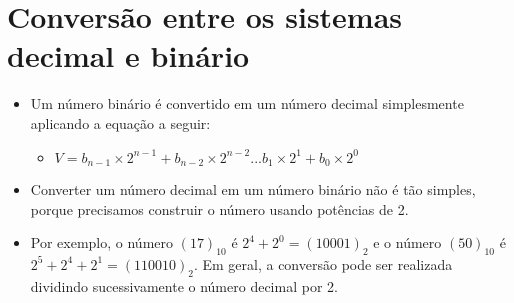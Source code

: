 \section{Conversão entre os sistemas decimal e binário}

\begin{frame}{\insertsection}
	\begin{itemize}
        \item Um número binário é convertido em um número decimal simplesmente aplicando a equação a seguir:
        \begin{itemize}
            \item $V = b_{n-1} \times 2^{n-1} + b_{n-2} \times 2^{n-2} ... b_1 \times 2^1 + b_0 \times 2^0$
        \end{itemize}
        \item Converter um número decimal em um número binário não é tão simples, porque precisamos construir o número usando potências de 2. 
        \item Por exemplo, o número $(17)_{10}$ é $2^4 + 2^0 = (10001)_2$ e o número $(50)_{10}$ é $2^5 + 2^4 + 2^1 = (110010)_2$. Em geral, a conversão pode ser realizada dividindo sucessivamente o número decimal por 2.
    \end{itemize}
\end{frame}

